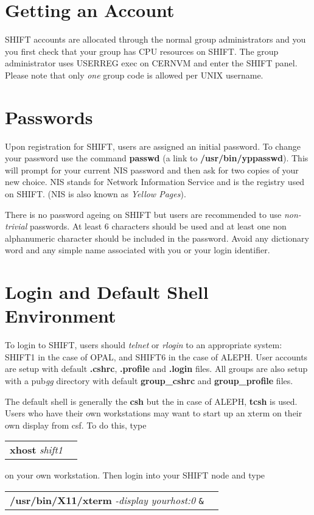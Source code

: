  
\section{Getting an Account}
 
SHIFT accounts are allocated through the normal group administrators
and you you first check that your group has CPU resources on SHIFT.
The group administrator uses
USERREG exec on CERNVM and enter the SHIFT panel. Please note that
only {\it one} group code is allowed per UNIX username.
 
\section{Passwords}
 
Upon registration for SHIFT, users are assigned an initial password.
To change your
password use the command {\bf passwd} (a link to
{\bf /usr/bin/yppasswd}). This will prompt for your current NIS password
and then ask for two copies of your new choice. NIS stands for Network
Information Service and is the registry used on SHIFT. (NIS
is also known as {\em Yellow Pages}).
 
There is no password ageing on SHIFT but users are recommended to use
{\em non-trivial} passwords. At least 6 characters should be used
and at least one non alphanumeric character should be included in the
password. Avoid any dictionary word and any simple name associated with
you or your login identifier.
 
\section{Login and Default Shell Environment}
 
To login to SHIFT, users should {\it telnet} or {\it rlogin} to an appropriate
system: SHIFT1 in the case of OPAL, and SHIFT6 in the case of ALEPH.
User accounts are setup with default {\bf .cshrc},
{\bf .profile} and {\bf .login} files. All groups are also setup with a
pub{\it gg} directory with default {\bf group\_cshrc} and {\bf group\_profile}
files.
 
The default shell is generally the {\bf csh} but the in case of
ALEPH, {\bf tcsh} is used.
Users who have their own workstations may want to start up an xterm
on their own display from csf.
To do this, type
\begin{center}
\begin{tabular}{ll}
{\bf xhost }{\it shift1}
\end{tabular}
\end{center}
on your own workstation. Then login into your SHIFT node and type
\begin{center}
\begin{tabular}{ll}
{\bf /usr/bin/X11/xterm } {\it -display yourhost:0}  {\tt \&}
\end{tabular}
\end{center}
 
